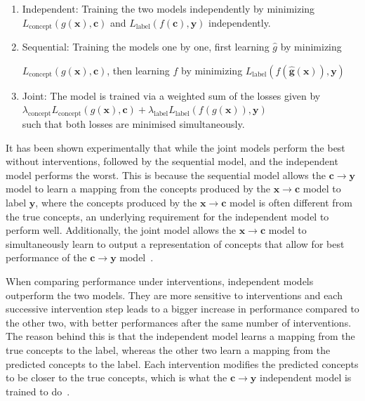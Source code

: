 \documentclass[../main.tex]{subfiles}
\begin{document}
\begin{enumerate}
    \item Independent: Training the two models independently by minimizing
    $L_{\text{concept}}(g(\mathbf{x}), \mathbf{c})$ and $L_{\text{label}}(f(\mathbf{c}), \mathbf{y})$ independently.
    \item Sequential: Training the models one by one, first learning
    $\hat{g}$ by minimizing 
    
    $L_{\text{concept}}(g(\mathbf{x}), \mathbf{c})$,
    then learning $f$ by minimizing $L_{\text{label}}(f(\mathbf{\hat{g}(\mathbf{x})}), \mathbf{y})$
    \item Joint: The model is trained via a weighted sum of the losses given by \\ 
    $\lambda_{\text{concept}} L_{\text{concept}}(g(\mathbf{x}), \mathbf{c}) + \lambda_{\text{label}} L_{\text{label}}(f(g(\mathbf{x})), \mathbf{y})$ \\
    such that both losses are minimised simultaneously.
\end{enumerate}

It has been shown experimentally that while the joint models perform the best
without interventions, followed by the sequential model, and the independent model
performs the worst. This is because the sequential model allows the $\mathbf{c} \to \mathbf{y}$ 
model to learn a mapping from the concepts produced by the $\mathbf{x} \to \mathbf{c}$ model to
label $\mathbf{y}$, where the concepts produced by the $\mathbf{x} \to \mathbf{c}$ model is often different
from the true concepts, an underlying requirement for the independent model to perform well. Additionally,
the joint model allows the $\mathbf{x} \to \mathbf{c}$ model to simultaneously learn to output a representation
of concepts that allow for best performance of the $\mathbf{c} \to \mathbf{y}$ model~\cite{cbm}.

When comparing performance under interventions,
independent models outperform the two models.
They are more sensitive to interventions and each successive intervention step
leads to a bigger increase in performance compared to the other two,
with better performances after the same number of interventions.
The reason behind this
is that the independent model learns a mapping from the true concepts to the label,
whereas the other two learn a mapping from the predicted concepts to the label. Each intervention
modifies the predicted concepts to be closer to the true concepts, which is what the 
$\mathbf{c} \to \mathbf{y}$ independent model is trained to do~\cite{cbm}.
\end{document}
